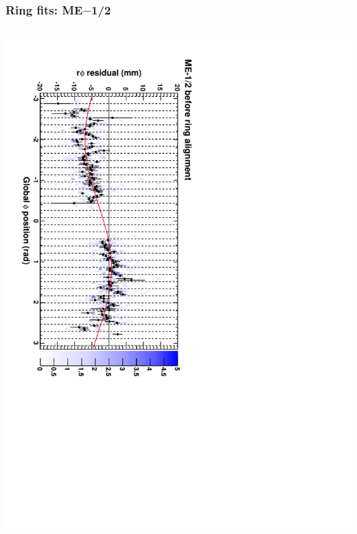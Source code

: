 \documentclass[compress]{beamer}
\begin{document}
\begin{frame}
\frametitle{Ring fits: ME$-$1/2}
\vfill
\begin{columns}
\includegraphics[height=\linewidth, angle=90]{ringfits_before/mem12.pdf}


\end{columns}
\end{frame}
\end{document}
